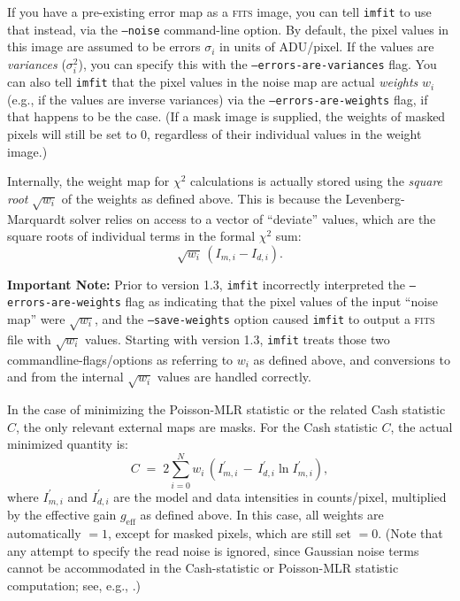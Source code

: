 \documentclass[10pt,a4paper,article]{memoir}
\newcommand{\imfitprog}{\texttt{imfit}}
\newcommand{\chisquare}{\ensuremath{\chi^{2}}}
\begin{document}
If you have a pre-existing error map as a \textsc{fits} image, you can tell \imfitprog{} to
use that instead, via the \texttt{--noise} command-line option. By default, the
pixel values in this image are assumed to be errors $\sigma_{i}$ in units of
ADU/pixel. If the values are \textit{variances} ($\sigma_{i}^2$), you can specify
this with the \texttt{--errors-are-variances} flag. You can also tell \imfitprog{}
that the pixel values in the noise map are actual \textit{weights} $w_{i}$ (e.g.,
if the values are inverse variances) via the
\texttt{--errors-are-weights} flag, if that happens to be the case. (If a mask
image is supplied, the weights of masked pixels will still be set to 0,
regardless of their individual values in the weight image.)

Internally, the weight map for \chisquare{} calculations is actually stored using
the \textit{square root} $\sqrt{w_{i}}$ of the weights as defined above. This is because the
Levenberg-Marquardt solver relies on access to a vector of ``deviate'' values, which are
the square roots of individual terms in the formal \chisquare{} sum:
\begin{equation}
\sqrt{w_{i}} \, (I_{m, i} - I_{d, i}) .
\end{equation}

\textbf{Important Note:} Prior to version 1.3, \imfitprog{} incorrectly
interpreted the \texttt{--errors-are-weights} flag as indicating that
the pixel values of the input ``noise map'' were $\sqrt{w_{i}}$, and the
\texttt{--save-weights} option caused \imfitprog{} to output a \textsc{fits} file with
$\sqrt{w_{i}}$ values. Starting with version 1.3, \imfitprog{} treats those two
commandline-flags/options as referring to $w_{i}$ as defined above, and
conversions to and from the internal $\sqrt{w_{i}}$ values are handled
correctly.

\bigskip

In the case of minimizing the Poisson-MLR statistic or the related Cash statistic $C$, the 
only relevant external maps are masks. For the Cash statistic $C$, the actual minimized 
quantity is:
\begin{equation}
C \; = \; 2 \sum_{i = 0}^{N} w_{i} \, (I^{\prime}_{m, i} \, - \, I^{\prime}_{d, i} \ln I^{\prime}_{m, i}),
\end{equation}
where $I^{\prime}_{m, i}$ and $I^{\prime}_{d, i}$ are the model and data
intensities in counts/pixel, multiplied by the effective gain $g_{\mathrm{eff}}$ as defined 
above.  In this case, all weights are automatically $=1$, except for masked pixels, which 
are still set $= 0$. (Note that any attempt to specify the read noise is ignored, since 
Gaussian noise terms cannot be accommodated in the Cash-statistic or Poisson-MLR statistic
computation; see, e.g., \citealt{erwin15}.)
\end{document}
